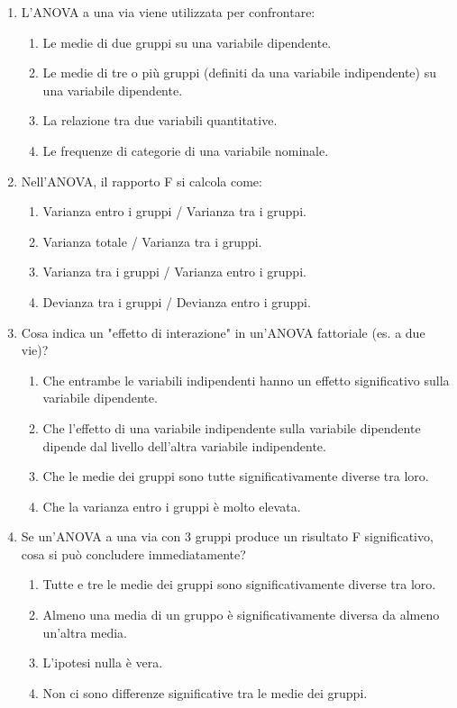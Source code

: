 \documentclass[12pt, a4paper]{article}
\begin{document}
\begin{enumerate}[resume]
    \item L'ANOVA a una via viene utilizzata per confrontare:
    \begin{enumerate}
        \item Le medie di due gruppi su una variabile dipendente.
        \item Le medie di tre o più gruppi (definiti da una variabile indipendente) su una variabile dipendente.
        \item La relazione tra due variabili quantitative.
        \item Le frequenze di categorie di una variabile nominale.
    \end{enumerate}
    \vspace{0.3cm}

    \item Nell'ANOVA, il rapporto F si calcola come:
    \begin{enumerate}
        \item Varianza entro i gruppi / Varianza tra i gruppi.
        \item Varianza totale / Varianza tra i gruppi.
        \item Varianza tra i gruppi / Varianza entro i gruppi.
        \item Devianza tra i gruppi / Devianza entro i gruppi.
    \end{enumerate}
    \vspace{0.3cm}

    \item Cosa indica un "effetto di interazione" in un'ANOVA fattoriale (es. a due vie)?
    \begin{enumerate}
        \item Che entrambe le variabili indipendenti hanno un effetto significativo sulla variabile dipendente.
        \item Che l'effetto di una variabile indipendente sulla variabile dipendente dipende dal livello dell'altra variabile indipendente.
        \item Che le medie dei gruppi sono tutte significativamente diverse tra loro.
        \item Che la varianza entro i gruppi è molto elevata.
    \end{enumerate}
    \vspace{0.3cm}

    \item Se un'ANOVA a una via con 3 gruppi produce un risultato F significativo, cosa si può concludere immediatamente?
    \begin{enumerate}
        \item Tutte e tre le medie dei gruppi sono significativamente diverse tra loro.
        \item Almeno una media di un gruppo è significativamente diversa da almeno un'altra media.
        \item L'ipotesi nulla è vera.
        \item Non ci sono differenze significative tra le medie dei gruppi.
    \end{enumerate}
    \vspace{0.3cm}


\end{enumerate}
\end{document}
